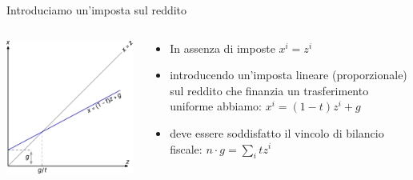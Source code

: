 \documentclass[aspectratio=64,12pt]{beamer}
\begin{document}
\begin{frame}{Introduciamo un'imposta sul reddito}
\begin{columns}[T]
\begin{column}{.55\columnwidth}
\begin{center}
\includegraphics[scale=.9]{./figure/effetto-distorsivo-imposte-ql-color-2.pdf}
\end{center}
\end{column}


\begin{column}{.45\columnwidth}
\begin{itemize}
\item In assenza di imposte $x^i=z^i$
\item introducendo un'imposta lineare (proporzionale) sul reddito che finanzia un
trasferimento uniforme abbiamo: $x^i=(1-t)z^i+g$
\item deve essere soddisfatto il vincolo di bilancio fiscale: $n\cdot g=\sum_itz^i$
\end{itemize}
\end{column}
\end{columns}
\end{frame}
\end{document}
